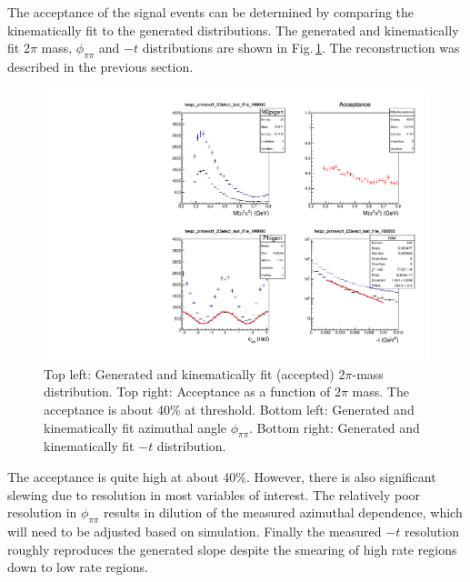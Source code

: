 The acceptance of the signal events can be determined by comparing the
kinematically fit to the generated distributions. The generated and
kinematically fit 2$\pi$ mass, $\phi_{\pi\pi}$ and $-t$ distributions
are shown in
Fig.\,\ref{fig:twopi_primakoff_DSelect_p1_W_100000_sum}. The
reconstruction was described in the previous section.
\begin{figure}[tph]
\centering
\includegraphics[width=6in]{figures/twopi_primakoff_DSelect_test_File_100000_sum_PrimNC.pdf}
\caption{Top left: Generated and kinematically fit (accepted) 2$\pi$-mass distribution. Top right: Acceptance as a function of 2$\pi$ mass. The acceptance is about 40\% at threshold. Bottom left: Generated and kinematically fit azimuthal angle $\phi_{\pi\pi}$. Bottom right: Generated and kinematically fit $-t$ distribution. }
\label{fig:twopi_primakoff_DSelect_p1_W_100000_sum}
\end{figure}
The acceptance is quite high at about 40\%. However, there is also
significant slewing due to resolution in most variables of
interest.  The
relatively poor resolution in $\phi_{\pi\pi}$ results in dilution of
the measured azimuthal dependence, which will need to be adjusted
based on simulation. Finally the measured $-t$ resolution roughly reproduces the generated slope despite the smearing of high rate regions down to low rate
regions.
